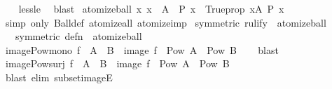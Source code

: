\begin{isabellebody}
%
\isadelimproof
\ \ %
\endisadelimproof
%
\isatagproof
{}\isamarkupfalse%
\ less{\isacharunderscore}{\kern0pt}le\ \isamarkupfalse%
\ blast%
\endisatagproof
{\isafoldproof}%
%
\isadelimproof
\isanewline
%
\endisadelimproof
\isanewline
{}\isamarkupfalse%
\ atomize{\isacharunderscore}{\kern0pt}ball{\isacharcolon}{\kern0pt}\ {\isachardoublequoteopen}{\isacharparenleft}{\kern0pt}{\isasymAnd}x{\isachardot}{\kern0pt}\ x\ {\isasymin}\ A\ {\isasymLongrightarrow}\ P\ x{\isacharparenright}{\kern0pt}\ {\isasymequiv}\ Trueprop\ {\isacharparenleft}{\kern0pt}{\isasymforall}x{\isasymin}A{\isachardot}{\kern0pt}\ P\ x{\isacharparenright}{\kern0pt}{\isachardoublequoteclose}\isanewline
%
\isadelimproof
\ \ %
\endisadelimproof
%
\isatagproof
{}\isamarkupfalse%
\ {\isacharparenleft}{\kern0pt}simp\ only{\isacharcolon}{\kern0pt}\ Ball{\isacharunderscore}{\kern0pt}def\ atomize{\isacharunderscore}{\kern0pt}all\ atomize{\isacharunderscore}{\kern0pt}imp{\isacharparenright}{\kern0pt}%
\endisatagproof
{\isafoldproof}%
%
\isadelimproof
\isanewline
%
\endisadelimproof
\isanewline
{}\isamarkupfalse%
\ {\isacharbrackleft}{\kern0pt}symmetric{\isacharcomma}{\kern0pt}\ rulify{\isacharbrackright}{\kern0pt}\ {\isacharequal}{\kern0pt}\ atomize{\isacharunderscore}{\kern0pt}ball\isanewline
\ \ \ {\isacharbrackleft}{\kern0pt}symmetric{\isacharcomma}{\kern0pt}\ defn{\isacharbrackright}{\kern0pt}\ {\isacharequal}{\kern0pt}\ atomize{\isacharunderscore}{\kern0pt}ball\isanewline
\isanewline
{}\isamarkupfalse%
\ image{\isacharunderscore}{\kern0pt}Pow{\isacharunderscore}{\kern0pt}mono{\isacharcolon}{\kern0pt}\ {\isachardoublequoteopen}f\ {\isacharbackquote}{\kern0pt}\ A\ {\isasymsubseteq}\ B\ {\isasymLongrightarrow}\ image\ f\ {\isacharbackquote}{\kern0pt}\ Pow\ A\ {\isasymsubseteq}\ Pow\ B{\isachardoublequoteclose}\isanewline
%
\isadelimproof
\ \ %
\endisadelimproof
%
\isatagproof
{}\isamarkupfalse%
\ blast%
\endisatagproof
{\isafoldproof}%
%
\isadelimproof
\isanewline
%
\endisadelimproof
\isanewline
{}\isamarkupfalse%
\ image{\isacharunderscore}{\kern0pt}Pow{\isacharunderscore}{\kern0pt}surj{\isacharcolon}{\kern0pt}\ {\isachardoublequoteopen}f\ {\isacharbackquote}{\kern0pt}\ A\ {\isacharequal}{\kern0pt}\ B\ {\isasymLongrightarrow}\ image\ f\ {\isacharbackquote}{\kern0pt}\ Pow\ A\ {\isacharequal}{\kern0pt}\ Pow\ B{\isachardoublequoteclose}\isanewline
%
\isadelimproof
\ \ %
\endisadelimproof
%
\isatagproof
{}\isamarkupfalse%
\ {\isacharparenleft}{\kern0pt}blast\ elim{\isacharcolon}{\kern0pt}\ subset{\isacharunderscore}{\kern0pt}imageE{\isacharparenright}{\kern0pt}%

\end{isabellebody}
